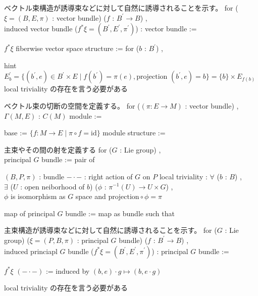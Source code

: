 \begin{Definition}
\itemnote
  ベクトル束構造が誘導束などに対して自然に誘導されることを示す。
\itemdefi
  for (\(\xi = (B , E , \pi)\) : vector bundle) (\(f\) : \(B^{\prime} \to B\)) ,\\
  induced vector bundle (\(f^*\xi = (B^{\prime} , E^{\prime} , \pi^{\prime})\)) : vector bundle :=
  \begin{itemize}
    \itemenum \(f^*\xi\)
    \itemenum fiberwise vector space structure :=
      for (\(b\) : \(B^{\prime}\)) , 
  \end{itemize}
  hint \(E^{\prime}_b = \{(b^{\prime} , e) \in B^{\prime} \times E \mid f(b^{\prime}) = \pi(e) , \text{projection }(b^{\prime} , e) = b\} = \{b\} \times E_{f(b)}\)
\itemprof
  local triviality の存在を言う必要がある \WIP
\end{Definition}

\begin{Definition}
\itemnote
  ベクトル束の切断の空間を定義する。
\itemdefi
  for (\((\pi : E \to M)\) : vector bundle) ,\\
  \(\Gamma(M , E)\) : \(C(M)\) module :=
  \begin{itemize}
    \itemenum base := \(\{f : M \to E \mid \pi \circ f = \text{id}\}\)
    \itemenum module structure := 
  \end{itemize}
\end{Definition}

\begin{Definition}
\itemnote
  主束やその間の射を定義する
\itemdefi
  for (\(G\) : Lie group) ,\\
  principal \(G\) bundle := pair of
  \begin{itemize}
    \itemenum \((B , P , \pi)\) : bundle
    \itemenum \(- \cdot -\) : right action of \(G\) on \(P\)
    \itemwith local triviality :
      \(\forall\) (\(b\) : \(B\)) ,\\
      \(\exists\) (\(U\) : open neiborhood of \(b\)) (\(\phi\) : \(\pi^{-1}(U) \to U \times G\)) , \\
      \(\phi\) is isomorphism as \(G\) space and \(\text{projection} \circ \phi = \pi\)
  \end{itemize}
\itemdefi
  map of principal \(G\) bundle := map as bundle such that 
\end{Definition}

\begin{Definition}
\itemnote
  主束構造が誘導束などに対して自然に誘導されることを示す。
\itemdefi
  for (\(G\) : Lie group) (\(\xi = (P , B , \pi)\) : principal \(G\) bundle) (\(f\) : \(B^{\prime} \to B\)) ,\\
  induced princiapl \(G\) bundle (\(f^*\xi = (B^{\prime} , E^{\prime} , \pi^{\prime})\)) : principal \(G\) bundle :=
  \begin{itemize}
    \itemenum \(f^*\xi\)
    \itemenum \((- \cdot -)\) := induced by \((b , e) \cdot g \mapsto (b , e \cdot g)\)
  \end{itemize}
\itemprof
  local triviality の存在を言う必要がある \WIP
\end{Definition}

